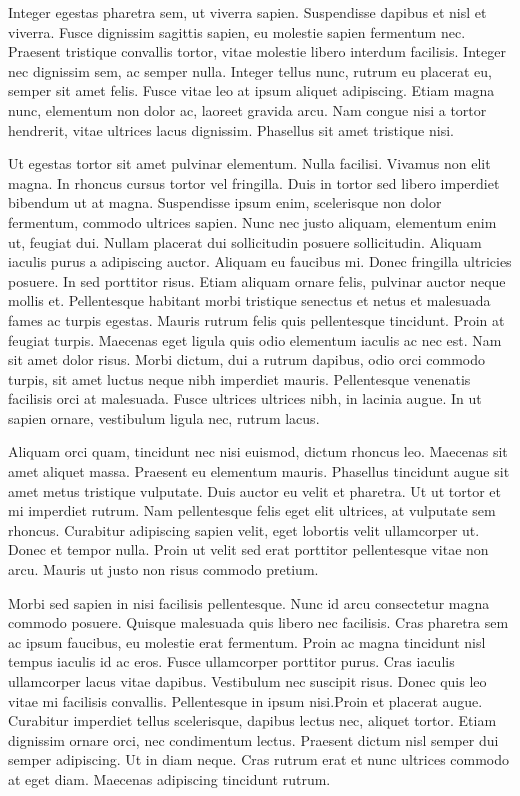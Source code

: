 Integer egestas pharetra sem, ut viverra sapien. Suspendisse dapibus et nisl et viverra. Fusce dignissim sagittis sapien, eu molestie sapien fermentum nec. Praesent tristique convallis tortor, vitae molestie libero interdum facilisis. Integer nec dignissim sem, ac semper nulla. Integer tellus nunc, rutrum eu placerat eu, semper sit amet felis. Fusce vitae leo at ipsum aliquet adipiscing. Etiam magna nunc, elementum non dolor ac, laoreet gravida arcu. Nam congue nisi a tortor hendrerit, vitae ultrices lacus dignissim. Phasellus sit amet tristique nisi.

Ut egestas tortor sit amet pulvinar elementum. Nulla facilisi. Vivamus non elit magna. In rhoncus cursus tortor vel fringilla. Duis in tortor sed libero imperdiet bibendum ut at magna. Suspendisse ipsum enim, scelerisque non dolor fermentum, commodo ultrices sapien. Nunc nec justo aliquam, elementum enim ut, feugiat dui. Nullam placerat dui sollicitudin posuere sollicitudin. Aliquam iaculis purus a adipiscing auctor. Aliquam eu faucibus mi. Donec fringilla ultricies posuere. In sed porttitor risus. Etiam aliquam ornare felis, pulvinar auctor neque mollis et. Pellentesque habitant morbi tristique senectus et netus et malesuada fames ac turpis egestas. Mauris rutrum felis quis pellentesque tincidunt. Proin at feugiat turpis. Maecenas eget ligula quis odio elementum iaculis ac nec est. Nam sit amet dolor risus. Morbi dictum, dui a rutrum dapibus, odio orci commodo turpis, sit amet luctus neque nibh imperdiet mauris. Pellentesque venenatis facilisis orci at malesuada. Fusce ultrices ultrices nibh, in lacinia augue. In ut sapien ornare, vestibulum ligula nec, rutrum lacus.

Aliquam orci quam, tincidunt nec nisi euismod, dictum rhoncus leo. Maecenas sit amet aliquet massa. Praesent eu elementum mauris. Phasellus tincidunt augue sit amet metus tristique vulputate. Duis auctor eu velit et pharetra. Ut ut tortor et mi imperdiet rutrum. Nam pellentesque felis eget elit ultrices, at vulputate sem rhoncus. Curabitur adipiscing sapien velit, eget lobortis velit ullamcorper ut. Donec et tempor nulla. Proin ut velit sed erat porttitor pellentesque vitae non arcu. Mauris ut justo non risus commodo pretium.

Morbi sed sapien in nisi facilisis pellentesque. Nunc id arcu consectetur magna commodo posuere. Quisque malesuada quis libero nec facilisis. Cras pharetra sem ac ipsum faucibus, eu molestie erat fermentum. Proin ac magna tincidunt nisl tempus iaculis id ac eros. Fusce ullamcorper porttitor purus. Cras iaculis ullamcorper lacus vitae dapibus. Vestibulum nec suscipit risus. Donec quis leo vitae mi facilisis convallis. Pellentesque in ipsum nisi.Proin et placerat augue. Curabitur imperdiet tellus scelerisque, dapibus lectus nec, aliquet tortor. Etiam dignissim ornare orci, nec condimentum lectus. Praesent dictum nisl semper dui semper adipiscing. Ut in diam neque. Cras rutrum erat et nunc ultrices commodo at eget diam. Maecenas adipiscing tincidunt rutrum.